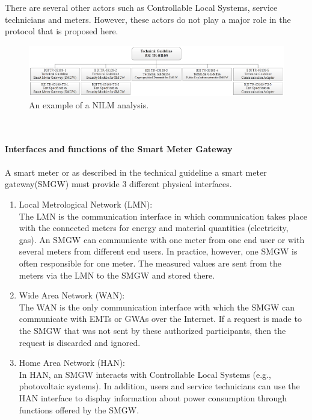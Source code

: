 There are several other actors such as Controllable Local Systems, service technicians and meters. However, these actors do not play a major role in the protocol that is proposed here.
\begin{figure}[tbp]
  \centering
  \includegraphics[width=1\textwidth]{images/BSI-TR-03109.png}
  \caption[Short description]{An example of a NILM analysis.}
  \label{fig:Appliance_Model}
\end{figure}
\\
\\
\textbf{Interfaces and functions of the Smart Meter Gateway}
\\
\\
A smart meter or as described in the technical guideline a smart meter gateway(SMGW) must provide 3 different physical interfaces.
\begin{enumerate}
\item Local Metrological Network (LMN):\\
The LMN is the communication interface in which communication takes place with the connected meters for energy and material quantities (electricity, gas). An SMGW can communicate with one meter from one end user or with several meters from different end users. In practice, however, one SMGW is often responsible for one meter. The measured values are sent from the meters via the LMN to the SMGW and stored there.
\item Wide Area Network (WAN):\\
The WAN is the only communication interface with which the SMGW can communicate with EMTs or GWAs over the Internet. If a request is made to the SMGW that was not sent by these authorized participants, then the request is discarded and ignored.
\item Home Area Network (HAN):\\
In HAN, an SMGW interacts with Controllable Local Systems (e.g., photovoltaic systems). In addition, users and service technicians can use the HAN interface to display information about power consumption through functions offered by the SMGW.
\end{enumerate}

